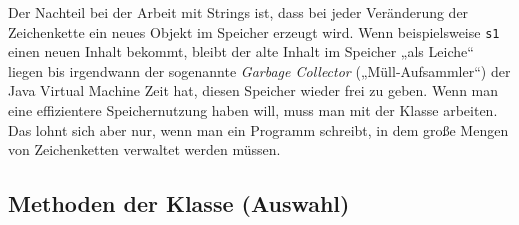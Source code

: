 \begin{framed}
Der Nachteil bei der Arbeit mit Strings ist, dass bei jeder Veränderung der
Zeichenkette ein neues Objekt im Speicher erzeugt wird. Wenn beispielsweise
\lstinline|s1| einen neuen Inhalt bekommt, bleibt der alte Inhalt im Speicher
„als Leiche“ liegen bis irgendwann der sogenannte \emph{Garbage Collector}
(„Müll-Aufsammler“) der Java Virtual Machine Zeit hat, diesen Speicher wieder
frei zu geben. Wenn man eine effizientere Speichernutzung haben will, muss man
mit der Klasse  arbeiten. Das lohnt sich aber nur, wenn
man ein Programm schreibt, in dem große Mengen von Zeichenketten verwaltet
werden müssen.
\end{framed}

\vfill

\subsection{Methoden der Klasse  (Auswahl)}


